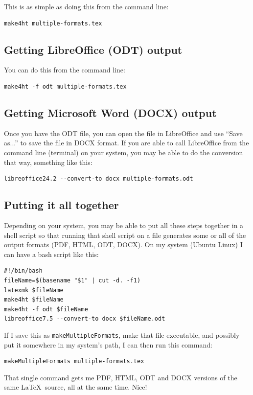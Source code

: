 \documentclass[a4paper,12pt]{article}
\begin{document}
This is as simple as doing this from the command line:
\begin{verbatim}
make4ht multiple-formats.tex
\end{verbatim}

\subsection{Getting LibreOffice (ODT) output}

You can do this from the command line:
\begin{verbatim}
make4ht -f odt multiple-formats.tex
\end{verbatim}

\subsection{Getting Microsoft Word (DOCX) output}
\label{msword}
Once you have the ODT file, you can open the file in LibreOffice and
use ``Save as...'' to save the file in DOCX format.  If you are able
to call LibreOffice from the command line (terminal) on your system,
you may be able to do the conversion that way, something like this:
\begin{verbatim}
libreoffice24.2 --convert-to docx multiple-formats.odt
\end{verbatim}

\subsection{Putting it all together}

Depending on your system, you may be able to put all these steps
together in a shell script so that running that shell script on a
file generates some or all of the output formats (PDF, HTML, ODT,
DOCX). On my system (Ubuntu Linux) I can have a bash script like this:
\begin{verbatim}
#!/bin/bash
fileName=$(basename "$1" | cut -d. -f1)
latexmk $fileName
make4ht $fileName
make4ht -f odt $fileName
libreoffice7.5 --convert-to docx $fileName.odt
\end{verbatim}
If I save this as \verb!makeMultipleFormats!, make that file
executable, and possibly put it somewhere in my system's path, I can
then run this command:
\begin{verbatim}
makeMultipleFormats multiple-formats.tex
\end{verbatim}
That single command gets me PDF, HTML, ODT and DOCX versions of the
same \LaTeX\ source, all at the same time. Nice!
\end{document}
